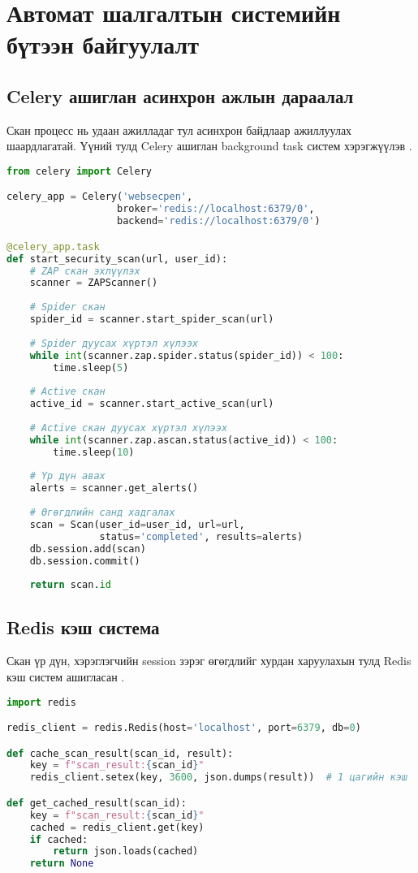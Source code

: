 \documentclass[main.tex]{subfiles}
\begin{document}
\section{Автомат шалгалтын системийн бүтээн байгуулалт}

\subsection{Celery ашиглан асинхрон ажлын дараалал}

Скан процесс нь удаан ажилладаг тул асинхрон байдлаар ажиллуулах шаардлагатай. Үүний тулд Celery ашиглан background task систем хэрэгжүүлэв \cite{13}.

\begin{lstlisting}[language=Python, caption=Celery асинхрон даалгавар]
from celery import Celery

celery_app = Celery('websecpen',
                   broker='redis://localhost:6379/0',
                   backend='redis://localhost:6379/0')

@celery_app.task
def start_security_scan(url, user_id):
    # ZAP скан эхлүүлэх
    scanner = ZAPScanner()
    
    # Spider скан
    spider_id = scanner.start_spider_scan(url)
    
    # Spider дуусах хүртэл хүлээх
    while int(scanner.zap.spider.status(spider_id)) < 100:
        time.sleep(5)
    
    # Active скан
    active_id = scanner.start_active_scan(url)
    
    # Active скан дуусах хүртэл хүлээх
    while int(scanner.zap.ascan.status(active_id)) < 100:
        time.sleep(10)
    
    # Үр дүн авах
    alerts = scanner.get_alerts()
    
    # Өгөгдлийн санд хадгалах
    scan = Scan(user_id=user_id, url=url, 
                status='completed', results=alerts)
    db.session.add(scan)
    db.session.commit()
    
    return scan.id
\end{lstlisting}

\subsection{Redis кэш система}

Скан үр дүн, хэрэглэгчийн session зэрэг өгөгдлийг хурдан харуулахын тулд Redis кэш систем ашигласан \cite{14}.

\begin{lstlisting}[language=Python, caption=Redis кэш системийн ашиглалт]
import redis

redis_client = redis.Redis(host='localhost', port=6379, db=0)

def cache_scan_result(scan_id, result):
    key = f"scan_result:{scan_id}"
    redis_client.setex(key, 3600, json.dumps(result))  # 1 цагийн кэш

def get_cached_result(scan_id):
    key = f"scan_result:{scan_id}"
    cached = redis_client.get(key)
    if cached:
        return json.loads(cached)
    return None
\end{lstlisting}
\end{document}
